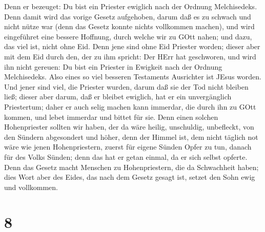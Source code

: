  Denn er bezeuget: Du bist ein Priester ewiglich nach der
Ordnung Melchisedeks.  Denn damit wird das vorige Gesetz
aufgehoben, darum daß es zu schwach und nicht nütze war 
(denn das Gesetz konnte nichts vollkommen machen), und wird eingeführet
eine bessere Hoffnung, durch welche wir zu GOtt nahen;  und
dazu, das viel ist, nicht ohne Eid. Denn jene sind ohne Eid Priester
worden;  dieser aber mit dem Eid durch den, der zu ihm
spricht: Der HErr hat geschworen, und wird ihn nicht gereuen: Du bist
ein Priester in Ewigkeit nach der Ordnung Melchisedeks. 
Also eines so viel besseren Testaments Ausrichter ist JEsus worden.
 Und jener sind viel, die Priester wurden, darum daß sie
der Tod nicht bleiben ließ;  dieser aber darum, daß er
bleibet ewiglich, hat er ein unvergänglich Priestertum; 
daher er auch selig machen kann immerdar, die durch ihn zu GOtt kommen,
und lebet immerdar und bittet für sie.  Denn einen solchen
Hohenpriester sollten wir haben, der da wäre heilig, unschuldig,
unbefleckt, von den Sündern abgesondert und höher, denn der Himmel ist,
 dem nicht täglich not wäre wie jenen Hohenpriestern,
zuerst für eigene Sünden Opfer zu tun, danach für des Volks Sünden; denn
das hat er getan einmal, da er sich selbst opferte.  Denn
das Gesetz macht Menschen zu Hohenpriestern, die da Schwachheit haben;
dies Wort aber des Eides, das nach dem Gesetz gesagt ist, setzet den
Sohn ewig und vollkommen.

\hypertarget{section-6}{%
\section{8}\label{section-6}}

